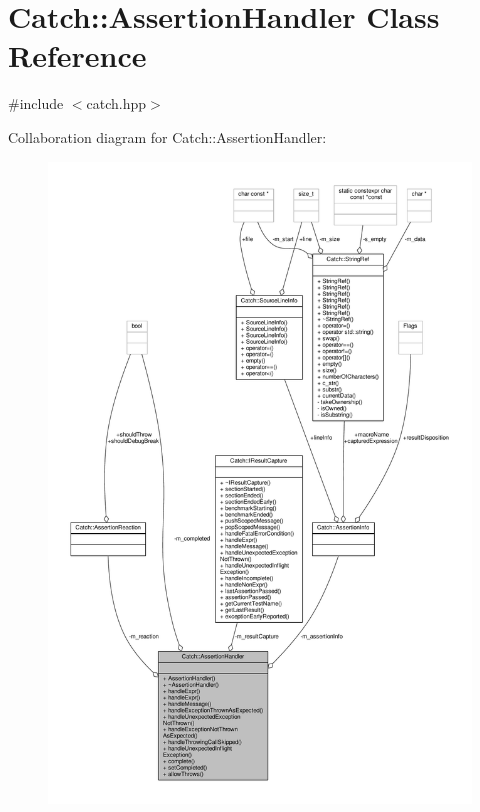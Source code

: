 \hypertarget{class_catch_1_1_assertion_handler}{\section{Catch\-:\-:Assertion\-Handler Class Reference}
\label{class_catch_1_1_assertion_handler}
}


{\ttfamily \#include $<$catch.\-hpp$>$}



Collaboration diagram for Catch\-:\-:Assertion\-Handler\-:
\nopagebreak
\begin{figure}[H]
\begin{center}
\leavevmode
\includegraphics[width=350pt]{class_catch_1_1_assertion_handler__coll__graph}
\end{center}
\end{figure}
